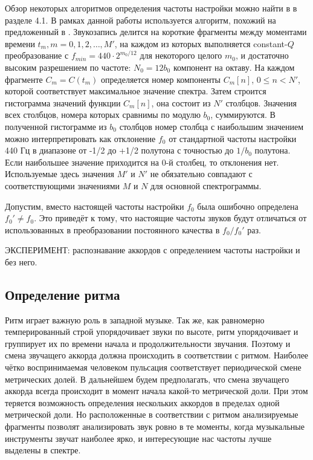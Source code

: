 Обзор некоторых алгоритмов определения частоты настройки можно найти в
\cite{Lerch2006} в разделе 4.1. В рамках данной работы используется алгоритм,
похожий на предложенный в \cite{Zhu2005}. Звукозапись делится на короткие
фрагменты между моментами времени $t_m, m = 0, 1, 2, \dots, M'$, на каждом из
которых выполняется constant-$Q$ преобразование с $f_{min} = 440 \cdot
2^{m_0/12}$ для некоторого целого $m_0$, и достаточно высоким разрешением по
частоте: $N_0 = 12 b_0$ компонент на октаву. На каждом фрагменте $C_m = C(t_m)$
определяется номер компоненты $C_m[n]$, $0 \leq n < N'$, которой соответствует
максимальное значение спектра. Затем строится гистограмма значений функции
$C_m[n]$, она состоит из $N'$ столбцов. Значения всех столбцов, номера которых
сравнимы по модулю $b_0$, суммируются. В полученной гистограмме из $b_0$
столбцов номер столбца с наибольшим значением можно интерпретировать как
отклонение $f_0$ от стандартной частоты настройки 440 Гц в диапазоне от -1/2 до
+1/2 полутона с точностью до $1/b_0$ полутона. Если наибольшее значение
приходится на 0-й столбец, то отклонения нет. Используемые здесь значения $M'$ и
$N'$ не обязательно совпадают с соответствующими значениями $M$ и $N$ для
основной спектрограммы.

Допустим, вместо настоящей частоты настройки $f_0$ была ошибочно определена
$f_0' \neq f_0$. Это приведёт к тому, что настоящие частоты звуков будут
отличаться от использованных в преобразовании постоянного качества в $f_0 /
f_0'$ раз.

ЭКСПЕРИМЕНТ: распознавание аккордов с определением частоты настройки и без него.

\subsection{Определение ритма} \label{ssect1_rhyhtm}

Ритм играет важную роль в западной музыке. Так же, как равномерно
темперированный строй упорядочивает звуки по высоте, ритм упорядочивает и
группирует их по времени начала и продолжительности звучания. Поэтому и смена
звучащего аккорда должна происходить в соответствии с ритмом. Наиболее чётко
воспринимаемая человеком пульсация соответствует периодической смене метрических
долей. В дальнейшем будем предполагать, что смена звучащего аккорда всегда
происходит в момент начала какой-то метрической доли. При этом теряется
возможность определения нескольких аккордов в пределах одной метрической доли.
Но расположенные в соответствии с ритмом анализируемые фрагменты позволят
анализировать звук ровно в те моменты, когда музыкальные инструменты звучат
наиболее ярко, и интересующие нас частоты лучше выделены в спектре.

